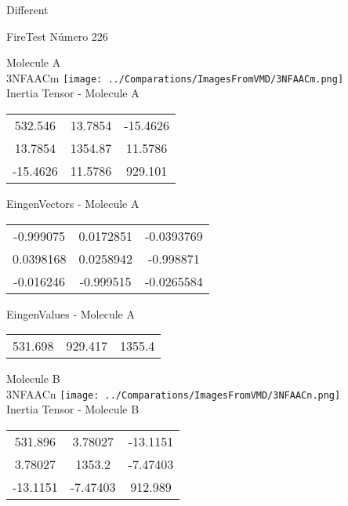 \begin{center}
\vtab
\vtab
\textcolor{NavyBlue}{\Large Different}
\end{center}

 \newpage

\vtab[-2cm]
\begin{center}
{\large FireTest \tab Número 226}
\end{center}
\begin{multicols}{2}
\begin{center}

Molecule A \\ 
3NFAACm
\texttt{[image: ../Comparations/ImagesFromVMD/3NFAACm.png]}
\\
Inertia Tensor - Molecule A \\
\vtab

\begin{tabular}{|c c c|}
532.546	 & 	13.7854	 & 	-15.4626	 \\
13.7854	 & 	1354.87	 & 	11.5786	 \\
-15.4626	 & 	11.5786	 & 	929.101
\end{tabular}

\vtab
 EingenVectors - Molecule A     \\
\vtab
\begin{tabular}{|c c c|}
-0.999075	 & 	0.0172851	 & 	-0.0393769	 \\
0.0398168	 & 	0.0258942	 & 	-0.998871	 \\
-0.016246	 & 	-0.999515	 & 	-0.0265584
\end{tabular}

\vtab
 EingenValues - Molecule A     \\
\vtab
\begin{tabular}{|c c c|}
531.698	 & 	929.417	 & 	1355.4	 \\
\end{tabular}
\columnbreak

Molecule B \\ 
3NFAACn
\texttt{[image: ../Comparations/ImagesFromVMD/3NFAACn.png]}
\\
Inertia Tensor - Molecule B \\
\vtab

\begin{tabular}{|c c c|}
531.896	 & 	3.78027	 & 	-13.1151	 \\
3.78027	 & 	1353.2	 & 	-7.47403	 \\
-13.1151	 & 	-7.47403	 & 	912.989
\end{tabular}


\end{center}
\end{multicols}
